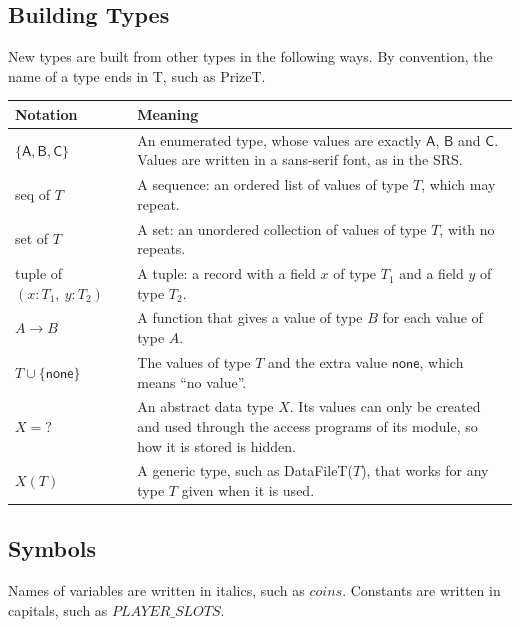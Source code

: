 \documentclass[10pt, titlepage]{article}
\newcommand{\T}[1]{\mathit{#1}}          %
\newcommand{\V}[1]{\mathsf{#1}}          %
\begin{document}
\subsection{Building Types}

New types are built from other types in the following ways. By convention, the
name of a type ends in T, such as PrizeT.

\begin{center}
\renewcommand{\arraystretch}{1.3}
\begin{tabular}{p{4.6cm} p{10cm}}
\toprule
\textbf{Notation} & \textbf{Meaning}\\
\midrule
$\{\V{A}, \V{B}, \V{C}\}$ & An enumerated type, whose values are exactly
$\V{A}$, $\V{B}$ and $\V{C}$. Values are written in a sans-serif font, as in
the SRS.\\
seq of $T$ & A sequence: an ordered list of values of type $T$, which may
repeat.\\
set of $T$ & A set: an unordered collection of values of type $T$, with no
repeats.\\
tuple of $(x : T_1,\ y : T_2)$ & A tuple: a record with a field $x$ of type
$T_1$ and a field $y$ of type $T_2$.\\
$A \to B$ & A function that gives a value of type $B$ for each value of type
$A$.\\
$T \cup \{\V{none}\}$ & The values of type $T$ and the extra value $\V{none}$,
which means ``no value''.\\
$X = ?$ & An abstract data type $X$. Its values can only be created and used
through the access programs of its module, so how it is stored is hidden.\\
$X(T)$ & A generic type, such as DataFileT($T$), that works for any type $T$
given when it is used.\\
\bottomrule
\end{tabular}
\end{center}

\subsection{Symbols}

Names of variables are written in italics, such as $\T{coins}$. Constants are
written in capitals, such as $\T{PLAYER\_SLOTS}$.
\end{document}
